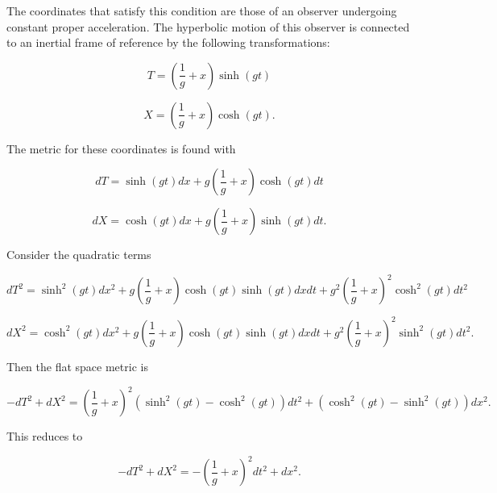 \documentclass[11pt]{article}
\begin{document}
The coordinates that satisfy this condition are those of an observer undergoing constant proper acceleration. The hyperbolic motion of this observer is connected to an inertial frame of reference by the following transformations:

\begin{equation}
    \label{hyperbolic-t-coord}
    T = \left(\frac{1}{g} + x \right) \sinh(gt)
\end{equation}

\begin{equation}
    \label{hyperbolic-x-coord}
    X = \left(\frac{1}{g} + x \right) \cosh(gt).
\end{equation}

The metric for these coordinates is found with

\begin{equation}
    \label{hyperbolic-t-diff}
    dT = \sinh(gt) dx + g\left(\frac{1}{g} + x\right) \cosh(gt) dt
\end{equation}

\begin{equation}
    \label{hyperbolic-x-diff}
    dX = \cosh(gt) dx + g \left(\frac{1}{g} + x \right) \sinh(gt) dt.
\end{equation}

Consider the quadratic terms

\begin{equation}
    \label{hyperbolic-t-squared}
    dT^2 = \sinh^2(gt) dx^2 + g\left(\frac{1}{g} + x\right) \cosh(gt) \sinh(gt) dx dt + g^2\left(\frac{1}{g} + x\right)^2 \cosh^2(gt) dt^2
\end{equation}

\begin{equation}
    \label{hyperbolic-x-squared}
    dX^2 = \cosh^2(gt) dx^2 + g\left(\frac{1}{g} + x\right) \cosh(gt) \sinh(gt) dx dt + g^2\left(\frac{1}{g} + x\right)^2 \sinh^2(gt) dt^2.
\end{equation}

Then the flat space metric is

\begin{equation}
    \label{flat-metric-coord}
    -dT^2 + dX^2 = \left(\frac{1}{g} + x \right)^2 (\sinh^2(gt) - \cosh^2(gt))dt^2 + (\cosh^2(gt) - \sinh^2(gt)) dx^2.
\end{equation}

This reduces to

\begin{equation}
    \label{flat-metric-coord-2}
    -dT^2 + dX^2 = -\left(\frac{1}{g} + x \right)^2 dt^2 +  dx^2.
\end{equation}
\end{document}
